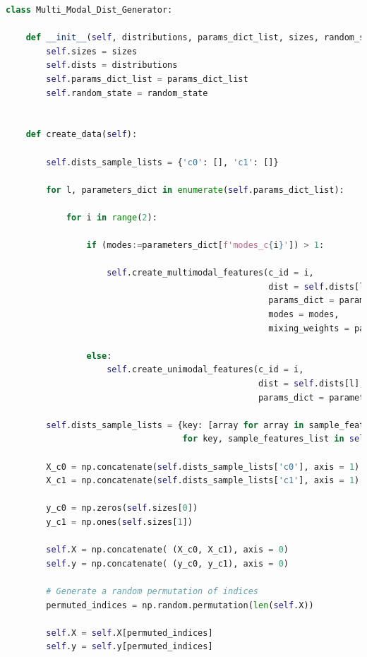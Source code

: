 \begin{lstlisting}[language=Python, numbers=none]
class Multi_Modal_Dist_Generator:
    
    def __init__(self, distributions, params_dict_list, sizes, random_state = 1234):
        self.sizes = sizes
        self.dists = distributions
        self.params_dict_list = params_dict_list
        self.random_state = random_state


    def create_data(self):
        
        self.dists_sample_lists = {'c0': [], 'c1': []}
        
        for l, parameters_dict in enumerate(self.params_dict_list):

            for i in range(2):

                if (modes:=parameters_dict[f'modes_c{i}']) > 1:
                    
                    self.create_multimodal_features(c_id = i, 
                                                    dist = self.dists[l], 
                                                    params_dict = parameters_dict[f'params_c{i}'], 
                                                    modes = modes, 
                                                    mixing_weights = parameters_dict[f'mixing_weights_c{i}'])

                else:
                    self.create_unimodal_features(c_id = i, 
                                                  dist = self.dists[l], 
                                                  params_dict = parameters_dict[f'params_c{i}'] )
        
        self.dists_sample_lists = {key: [array for array in sample_features_list]
                                   for key, sample_features_list in self.dists_sample_lists.items()}
        
        X_c0 = np.concatenate(self.dists_sample_lists['c0'], axis = 1)
        X_c1 = np.concatenate(self.dists_sample_lists['c1'], axis = 1)

        y_c0 = np.zeros(self.sizes[0])
        y_c1 = np.ones(self.sizes[1])

        self.X = np.concatenate( (X_c0, X_c1), axis = 0)
        self.y = np.concatenate( (y_c0, y_c1), axis = 0)

        # Generate a random permutation of indices
        permuted_indices = np.random.permutation(len(self.X))

        self.X = self.X[permuted_indices]
        self.y = self.y[permuted_indices]
\end{lstlisting}

